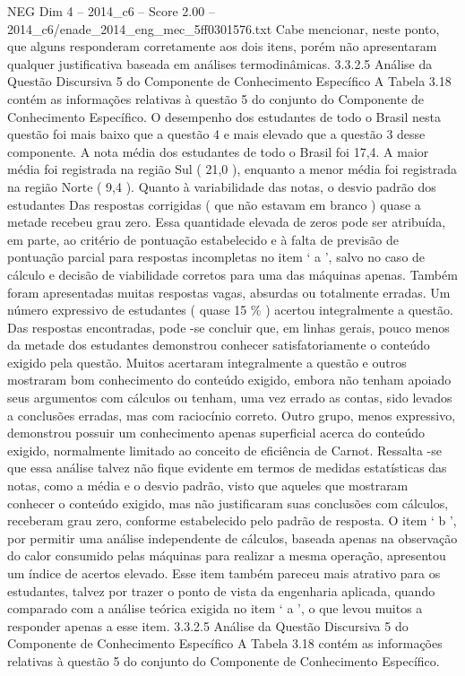 \begin{textsample}{NEG Dim 4 – 2014\_c6 – Score 2.00 – 2014\_c6/enade\_2014\_eng\_mec\_5ff0301576.txt}
Cabe mencionar, neste ponto, que alguns responderam corretamente aos dois itens, porém não apresentaram qualquer justificativa baseada em análises termodinâmicas. 3.3.2.5 Análise da Questão Discursiva 5 do Componente de Conhecimento Específico A Tabela 3.18 contém as informações relativas à questão 5 do conjunto do Componente de Conhecimento Específico.
O desempenho dos estudantes de todo o Brasil nesta questão foi mais baixo que a questão 4 e mais elevado que a questão 3 desse componente.
A nota média dos estudantes de todo o Brasil foi 17,4.
A maior média foi registrada na região Sul ( 21,0 ), enquanto a menor média foi registrada na região Norte ( 9,4 ).
Quanto à variabilidade das notas, o desvio padrão dos estudantes Das respostas corrigidas ( que não estavam em branco ) quase a metade recebeu grau zero.
Essa quantidade elevada de zeros pode ser atribuída, em parte, ao critério de pontuação estabelecido e à falta de previsão de pontuação parcial para respostas incompletas no item ‘ a ’, salvo no caso de cálculo e decisão de viabilidade corretos para uma das máquinas apenas.
Também foram apresentadas muitas respostas vagas, absurdas ou totalmente erradas.
Um número expressivo de estudantes ( quase 15 \% ) acertou integralmente a questão.
Das respostas encontradas, pode -se concluir que, em linhas gerais, pouco menos da metade dos estudantes demonstrou conhecer satisfatoriamente o conteúdo exigido pela questão.
Muitos acertaram integralmente a questão e outros mostraram bom conhecimento do conteúdo exigido, embora não tenham apoiado seus argumentos com cálculos ou tenham, uma vez errado as contas, sido levados a conclusões erradas, mas com raciocínio correto.
Outro grupo, menos expressivo, demonstrou possuir um conhecimento apenas superficial acerca do conteúdo exigido, normalmente limitado ao conceito de eficiência de Carnot.
Ressalta -se que essa análise talvez não fique evidente em termos de medidas estatísticas das notas, como a média e o desvio padrão, visto que aqueles que mostraram conhecer o conteúdo exigido, mas não justificaram suas conclusões com cálculos, receberam grau zero, conforme estabelecido pelo padrão de resposta.
O item ‘ b ’, por permitir uma análise independente de cálculos, baseada apenas na observação do calor consumido pelas máquinas para realizar a mesma operação, apresentou um índice de acertos elevado.
Esse item também pareceu mais atrativo para os estudantes, talvez por trazer o ponto de vista da engenharia aplicada, quando comparado com a análise teórica exigida no item ‘ a ’, o que levou muitos a responder apenas a esse item. 3.3.2.5 Análise da Questão Discursiva 5 do Componente de Conhecimento Específico A Tabela 3.18 contém as informações relativas à questão 5 do conjunto do Componente de Conhecimento Específico.

\end{textsample}
